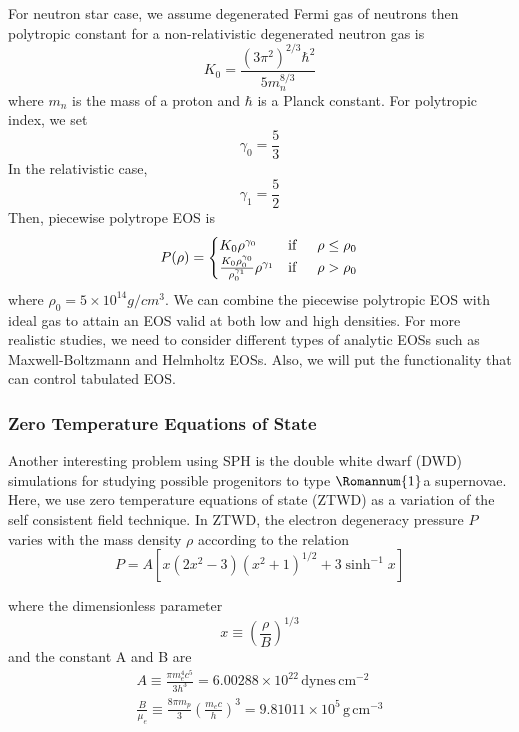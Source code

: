 \documentclass{article}
\begin{document}
For neutron star case, we assume degenerated Fermi gas of neutrons then polytropic constant for a non-relativistic degenerated neutron gas is
\begin{equation}
K_0 = \frac{(3 \pi^2)^{2/3} \hbar^2}{5 m_n^{8/3}}
\end{equation}
where $m_n$ is the mass of a proton and $\hbar$ is a Planck constant. For polytropic index, we set
\begin{equation}
\gamma_0 = \frac{5}{3}
\end{equation}
In the relativistic case,
\begin{equation}
\gamma_1 = \frac{5}{2}
\end{equation}
Then, piecewise polytrope EOS is
\begin{equation}
P(\rho) = \begin{cases}
K_0 \rho^{\gamma_0} & \text{if} \indent \rho \leq \rho_0 \\
\frac{K_0 \rho_0^{\gamma_0}}{\rho_0^{\gamma_1}} \rho^{\gamma_1} & \text{if} \indent \rho > \rho_0
\end{cases}
\end{equation}
where $\rho_0 = 5 \times 10^{14} g/cm^3$. We can combine the piecewise polytropic EOS with ideal gas to attain an EOS valid at both low and high densities. For more realistic studies, we need to consider different types of analytic EOSs such as Maxwell-Boltzmann and Helmholtz EOSs. Also, we will put the functionality that can control tabulated EOS.

\subsubsection{Zero Temperature Equations of State}
Another interesting problem using SPH is the double white dwarf (DWD) simulations for studying possible progenitors to type $\Romannum{1}$a supernovae. Here, we use zero temperature equations of state (ZTWD) as a variation of the self consistent field technique. In ZTWD, the electron degeneracy pressure $P$ varies with the mass density $\rho$ according to the relation
\begin{equation}
P = A \left[ x(2x^2-3)(x^2+1)^{1/2} + 3 \sinh^{-1} x \right]
\end{equation}

where the dimensionless parameter
\begin{equation}
x \equiv \left( \frac{\rho}{B} \right)^{1/3}
\end{equation}
and the constant A and B are
\begin{align}
A \equiv \frac{\pi m_e^4 c^5}{3h^3} = 6.00288 \times 10^{22} \, \text{dynes} \, \text{cm}^{-2} \\
\frac{B}{\mu_e} \equiv \frac{8 \pi m_p}{3} \left(\frac{m_e c}{h} \right)^3 = 9.81011 \times 10^5 \, \text{g} \, \text{cm}^{-3}
\end{align}
\end{document}
